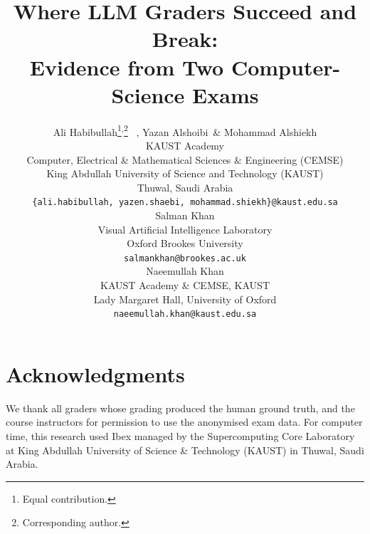 \documentclass{article}
\title{Where LLM Graders Succeed and Break: \\ Evidence from Two Computer-Science Exams}
\author{%
  Ali Habibullah\thanks{Equal contribution.}\hspace{0.35em}\textsuperscript{,}\thanks{Corresponding author.} \ , Yazan Alshoibi\footnotemark[1] \ \& Mohammad Alshiekh\footnotemark[1] \\
  KAUST Academy \\
  Computer, Electrical \& Mathematical Sciences \& Engineering (CEMSE) \\
  King Abdullah University of Science and Technology (KAUST) \\
  Thuwal, Saudi Arabia \\
  \texttt{\{ali.habibullah, yazen.shaebi, mohammad.shiekh\}@kaust.edu.sa} \\
  \AND
  Salman Khan \\
  Visual Artificial Intelligence Laboratory \\
  Oxford Brookes University \\
  \texttt{salmankhan@brookes.ac.uk} \\
  \And
  Naeemullah Khan \\
  KAUST Academy \& CEMSE, KAUST \\
  Lady Margaret Hall, University of Oxford \\
  \texttt{naeemullah.khan@kaust.edu.sa}
}
\begin{document}
\maketitle















\section*{Acknowledgments}
We thank all graders whose grading produced the human ground truth, and the course instructors for permission to use the anonymised exam data. For computer time, this research used Ibex managed by the Supercomputing Core Laboratory at King Abdullah University of Science \& Technology (KAUST) in Thuwal, Saudi Arabia.





\end{document}

